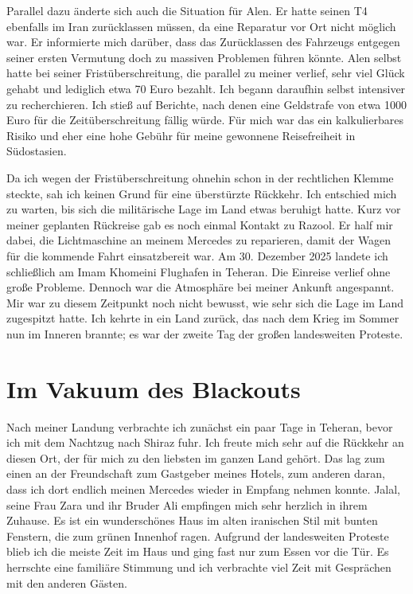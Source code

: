 Parallel dazu änderte sich auch die Situation für Alen. Er hatte seinen T4 ebenfalls im Iran zurücklassen müssen, da eine Reparatur vor Ort nicht möglich war. Er informierte mich darüber, dass das Zurücklassen des Fahrzeugs entgegen seiner ersten Vermutung doch zu massiven Problemen führen könnte. Alen selbst hatte bei seiner Fristüberschreitung, die parallel zu meiner verlief, sehr viel Glück gehabt und lediglich etwa 70 Euro bezahlt. Ich begann daraufhin selbst intensiver zu recherchieren. Ich stieß auf Berichte, nach denen eine Geldstrafe von etwa 1000 Euro für die Zeitüberschreitung fällig würde. Für mich war das ein kalkulierbares Risiko und eher eine hohe Gebühr für meine gewonnene Reisefreiheit in Südostasien.

Da ich wegen der Fristüberschreitung ohnehin schon in der rechtlichen Klemme steckte, sah ich keinen Grund für eine überstürzte Rückkehr. Ich entschied mich zu warten, bis sich die militärische Lage im Land etwas beruhigt hatte. Kurz vor meiner geplanten Rückreise gab es noch einmal Kontakt zu Razool. Er half mir dabei, die Lichtmaschine an meinem Mercedes zu reparieren, damit der Wagen für die kommende Fahrt einsatzbereit war. Am 30. Dezember 2025 landete ich schließlich am Imam Khomeini Flughafen in Teheran. Die Einreise verlief ohne große Probleme. Dennoch war die Atmosphäre bei meiner Ankunft angespannt. Mir war zu diesem Zeitpunkt noch nicht bewusst, wie sehr sich die Lage im Land zugespitzt hatte. Ich kehrte in ein Land zurück, das nach dem Krieg im Sommer nun im Inneren brannte; es war der zweite Tag der großen landesweiten Proteste.

\chapter*{Im Vakuum des Blackouts}

Nach meiner Landung verbrachte ich zunächst ein paar Tage in Teheran, bevor ich mit dem Nachtzug nach Shiraz fuhr. Ich freute mich sehr auf die Rückkehr an diesen Ort, der für mich zu den liebsten im ganzen Land gehört. Das lag zum einen an der Freundschaft zum Gastgeber meines Hotels, zum anderen daran, dass ich dort endlich meinen Mercedes wieder in Empfang nehmen konnte. Jalal, seine Frau Zara und ihr Bruder Ali empfingen mich sehr herzlich in ihrem Zuhause. Es ist ein wunderschönes Haus im alten iranischen Stil mit bunten Fenstern, die zum grünen Innenhof ragen. Aufgrund der landesweiten Proteste blieb ich die meiste Zeit im Haus und ging fast nur zum Essen vor die Tür. Es herrschte eine familiäre Stimmung und ich verbrachte viel Zeit mit Gesprächen mit den anderen Gästen.

